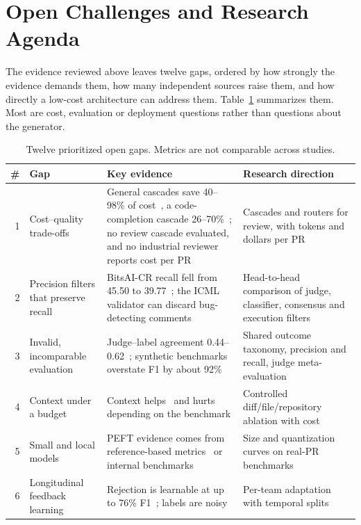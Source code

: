 \section{Open Challenges and Research Agenda}\label{sec:gaps}

The evidence reviewed above leaves twelve gaps, ordered by how strongly the evidence demands them, how many independent sources raise them, and how directly a low-cost architecture can address them. Table~\ref{tab:gaps} summarizes them. Most are cost, evaluation or deployment questions rather than questions about the generator.

\begin{table}[t]
\centering
\caption{Twelve prioritized open gaps. Metrics are not comparable across studies.}
\label{tab:gaps}
\footnotesize
\begin{tabularx}{\textwidth}{@{}r>{\raggedright\arraybackslash}p{2.6cm}>{\raggedright\arraybackslash}X>{\raggedright\arraybackslash}X@{}}
\toprule
\# & Gap & Key evidence & Research direction \\
\midrule
1 & Cost--quality trade-offs & General cascades save 40--98\% of cost~\cite{chen2023frugalgpt}, a code-completion cascade 26--70\%~\cite{chen2024model}; no review cascade evaluated, and no industrial reviewer reports cost per PR~\cite{sun2025bitsai,tantithamthavorn2026rovodev} & Cascades and routers for review, with tokens and dollars per PR \\
2 & Precision filters that preserve recall & BitsAI-CR recall fell from 45.50 to 39.77~\cite{sun2025bitsai}; the ICML validator can discard bug-detecting comments~\cite{lu2025towards} & Head-to-head comparison of judge, classifier, consensus and execution filters \\
3 & Invalid, incomparable evaluation & Judge--label agreement 0.44--0.62~\cite{karakaya2026understanding}; synthetic benchmarks overstate F1 by about 92\%~\cite{kumar2026bigger} & Shared outcome taxonomy, precision and recall, judge meta-evaluation \\
4 & Context under a budget & Context helps~\cite{hu2025benchmarking} and hurts~\cite{kumar2026swe,zhang2026aacr} depending on the benchmark & Controlled diff/file/repository ablation with cost \\
5 & Small and local models & PEFT evidence comes from reference-based metrics~\cite{lu2023llama} or internal benchmarks~\cite{maddila2025ai} & Size and quantization curves on real-PR benchmarks \\
6 & Longitudinal feedback learning & Rejection is learnable at up to 76\% F1~\cite{lin2026agentic}; labels are noisy~\cite{karakaya2026understanding} & Per-team adaptation with temporal splits \\

\end{tabularx}
\end{table}
